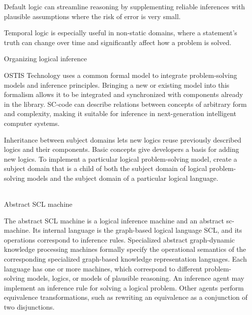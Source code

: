 \begin{frame}{}
\topline
\justifying
\vspace{10mm}

    \begin{textitemize}
        \item Default logic can streamline reasoning by supplementing reliable inferences with plausible assumptions where the risk of error is very small.
        \item Temporal logic is especially useful in non-static domains, where a statement's truth can change over time and significantly affect how a problem is solved.
    \end{textitemize}
\end{frame}


\begin{frame}{\large Organizing logical inference}
\topline
\justifying
\vspace{10mm}

    OSTIS Technology uses a common formal model to integrate problem-solving models and inference principles. Bringing a new or existing model into this formalism allows it to be integrated and synchronized with components already in the library. SC-code can describe relations between concepts of arbitrary form and complexity, making it suitable for inference in next-generation intelligent computer systems.

    Inheritance between subject domains lets new logics reuse previously described logics and their components. Basic concepts give developers a basis for adding new logics. To implement a particular logical problem-solving model, create a subject domain that is a child of both the subject domain of logical problem-solving models and the subject domain of a particular logical language.
\end{frame}

\begin{frame}{\\Abstract SCL machine}
\topline
\justifying
	\setlength{\emergencystretch}{2em}
\vspace{10mm}

The abstract SCL machine is a logical inference machine and an abstract sc-machine. Its internal language is the graph-based logical language SCL, and its operations correspond to inference rules. Specialized abstract graph-dynamic knowledge processing machines formally specify the operational semantics of the corresponding specialized graph-based knowledge representation languages. Each language has one or more machines, which correspond to different problem-solving models, logics, or models of plausible reasoning. An inference agent may implement an inference rule for solving a logical problem. Other agents perform equivalence transformations, such as rewriting an equivalence as a conjunction of two disjunctions.
\end{frame}

